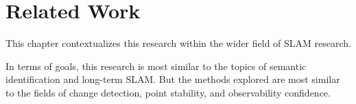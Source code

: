\section{Related Work}
\label{sec:related_work}

This chapter contextualizes this research within the wider field of SLAM research. 

In terms of goals, this research is most similar to the topics of semantic identification and long-term SLAM. But the methods explored are most similar to the fields of change detection, point stability, and observability confidence.

% 